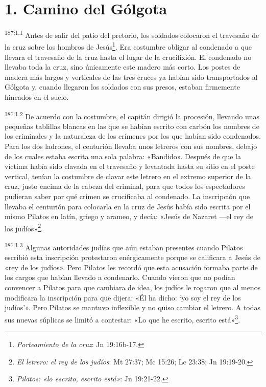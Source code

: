 \section*{1. Camino del Gólgota}
\par
\textsuperscript{187:1.1} Antes de salir del patio del pretorio, los soldados colocaron el travesaño de la cruz sobre los hombros de Jesús\footnote{\textit{Porteamiento de la cruz}: Jn 19:16b-17.}. Era costumbre obligar al condenado a que llevara el travesaño de la cruz hasta el lugar de la crucifixión. El condenado no llevaba toda la cruz, sino únicamente este madero más corto. Los postes de madera más largos y verticales de las tres cruces ya habían sido transportados al Gólgota y, cuando llegaron los soldados con sus presos, estaban firmemente hincados en el suelo.

\par
\textsuperscript{187:1.2} De acuerdo con la costumbre, el capitán dirigió la procesión, llevando unas pequeñas tablillas blancas en las que se habían escrito con carbón los nombres de los criminales y la naturaleza de los crímenes por los que habían sido condenados. Para los dos ladrones, el centurión llevaba unos letreros con sus nombres, debajo de los cuales estaba escrita una sola palabra: «Bandido». Después de que la víctima había sido clavada en el travesaño y levantada hasta su sitio en el poste vertical, tenían la costumbre de clavar este letrero en el extremo superior de la cruz, justo encima de la cabeza del criminal, para que todos los espectadores pudieran saber por qué crimen se crucificaba al condenado. La inscripción que llevaba el centurión para colocarla en la cruz de Jesús había sido escrita por el mismo Pilatos en latín, griego y arameo, y decía: «Jesús de Nazaret ---el rey de los judíos»\footnote{\textit{El letrero: el rey de los judíos}: Mt 27:37; Mc 15:26; Lc 23:38; Jn 19:19-20.}.

\par
\textsuperscript{187:1.3} Algunas autoridades judías que aún estaban presentes cuando Pilatos escribió esta inscripción protestaron enérgicamente porque se calificara a Jesús de «rey de los judíos». Pero Pilatos les recordó que esta acusación formaba parte de los cargos que habían llevado a condenarlo. Cuando vieron que no podían convencer a Pilatos para que cambiara de idea, los judíos le rogaron que al menos modificara la inscripción para que dijera: «Él ha dicho: `yo soy el rey de los judíos'». Pero Pilatos se mantuvo inflexible y no quiso cambiar el letrero. A todas sus nuevas súplicas se limitó a contestar: «Lo que he escrito, escrito está»\footnote{\textit{Pilatos: «lo escrito, escrito está»}: Jn 19:21-22.}.

